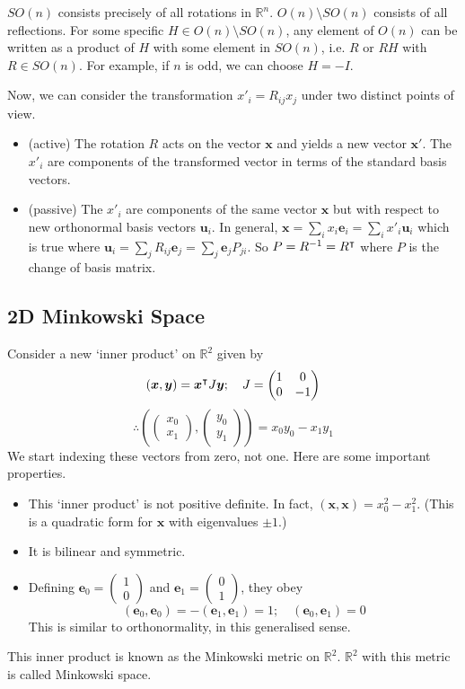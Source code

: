 \documentclass{article}
\begin{document}
$SO(n)$ consists precisely of all rotations in $\mathbb R^n$. $O(n) \setminus SO(n)$ consists of all reflections. For some specific $H \in O(n) \setminus SO(n)$, any element of $O(n)$ can be written as a product of $H$ with some element in $SO(n)$, i.e. $R$ or $RH$ with $R \in SO(n)$. For example, if $n$ is odd, we can choose $H = -I$.

Now, we can consider the transformation $x'_i = R_{ij} x_j$ under two distinct points of view.
\begin{itemize}
	\item (active) The rotation $R$ acts on the vector $\bm x$ and yields a new vector $\bm x'$. The $x'_i$ are components of the transformed vector in terms of the standard basis vectors.
	\item (passive) The $x'_i$ are components of the same vector $\bm x$ but with respect to new orthonormal basis vectors $\bm u_i$. In general, $\bm x = \sum_i x_i \bm e_i = \sum_i x'_i \bm u_i$ which is true where $\bm u_i = \sum_j R_{ij} \bm e_j = \sum_j \bm e_j P_{ji}$. So $P = R^{-1} = R^\intercal$ where $P$ is the change of basis matrix.
\end{itemize}

\subsection{2D Minkowski Space}
Consider a new `inner product' on $\mathbb R^2$ given by
\[ (\bm x, \bm y) = \bm x^\intercal J \bm y;\quad J = \begin{pmatrix}
		1 & 0 \\ 0 & -1
	\end{pmatrix} \]
\[ \therefore \left( \begin{pmatrix}
			x_0 \\ x_1
		\end{pmatrix}, \begin{pmatrix}
			y_0 \\ y_1
		\end{pmatrix} \right) = x_0 y_0 - x_1 y_1 \]
We start indexing these vectors from zero, not one. Here are some important properties.
\begin{itemize}
	\item This `inner product' is not positive definite. In fact, $(\bm x, \bm x) = x_0^2 - x_1^2$. (This is a  quadratic form for $\bm x$ with eigenvalues $\pm 1$.)
	\item It is bilinear and symmetric.
	\item Defining $\bm e_0 = \begin{pmatrix}
			      1 \\ 0
		      \end{pmatrix}$ and $\bm e_1 = \begin{pmatrix}
			      0 \\ 1
		      \end{pmatrix}$, they obey
	      \[ (\bm e_0, \bm e_0) = -(\bm e_1, \bm e_1) = 1;\quad (\bm e_0, \bm e_1) = 0 \]
	      This is similar to orthonormality, in this generalised sense.
\end{itemize}
This inner product is known as the Minkowski metric on $\mathbb R^2$. $\mathbb R^2$ with this metric is called Minkowski space.
\end{document}
